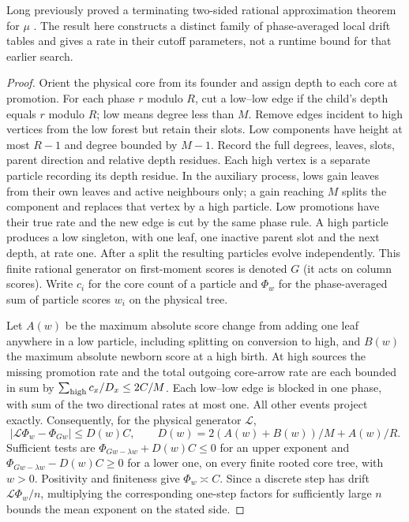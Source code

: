 \documentclass[11pt]{article}
\theoremstyle{remark}
\numberwithin{equation}{section}
\begin{document}
Long previously proved a terminating two-sided rational approximation theorem for $\mu$ \cite{LongKernel}. The result here constructs a distinct family of phase-averaged local drift tables and gives a rate in their cutoff parameters, not a runtime bound for that earlier search.
\begin{proof}
Orient the physical core from its founder and assign depth to each core at promotion. For each phase $r$ modulo $R$, cut a low--low edge if the child's depth equals $r$ modulo $R$; low means degree less than $M$. Remove edges incident to high vertices from the low forest but retain their slots. Low components have height at most $R-1$ and degree bounded by $M-1$. Record the full degrees, leaves, slots, parent direction and relative depth residues. Each high vertex is a separate particle recording its depth residue. In the auxiliary process, lows gain leaves from their own leaves and active neighbours only; a gain reaching $M$ splits the component and replaces that vertex by a high particle. Low promotions have their true rate and the new edge is cut by the same phase rule. A high particle produces a low singleton, with one leaf, one inactive parent slot and the next depth, at rate one. After a split the resulting particles evolve independently. This finite rational generator on first-moment scores is denoted $G$ (it acts on column scores). Write $c_i$ for the core count of a particle and $\Phi_w$ for the phase-averaged sum of particle scores $w_i$ on the physical tree.

Let $A(w)$ be the maximum absolute score change from adding one leaf anywhere in a low particle, including splitting on conversion to high, and $B(w)$ the maximum absolute newborn score at a high birth. At high sources the missing promotion rate and the total outgoing core-arrow rate are each bounded in sum by $\sum_{\rm high}c_x/D_x\le2C/M$. Each low--low edge is blocked in one phase, with sum of the two directional rates at most one. All other events project exactly. Consequently, for the physical generator $\mathcal L$,
\[
 |\mathcal L\Phi_w-\Phi_{Gw}|\le D(w) C,\qquad D(w)=2(A(w)+B(w))/M+A(w)/R.
\]
Sufficient tests are $\Phi_{Gw-\lambda w}+D(w)C\le0$ for an upper exponent and $\Phi_{Gw-\lambda w}-D(w)C\ge0$ for a lower one, on every finite rooted core tree, with $w>0$. Positivity and finiteness give $\Phi_w\asymp C$. Since a discrete step has drift $\mathcal L\Phi_w/n$, multiplying the corresponding one-step factors for sufficiently large $n$ bounds the mean exponent on the stated side.


\end{proof}
\end{document}
